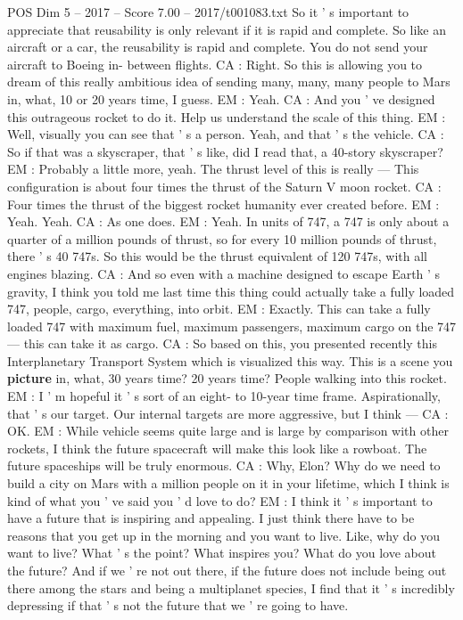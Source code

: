 \begin{textsample}{POS Dim 5 – 2017 – Score 7.00 – 2017/t001083.txt}
So it ' s important to appreciate that reusability is only relevant if it is rapid and complete.
So like an aircraft or a car, the reusability is rapid and complete.
You do not send your aircraft to Boeing in- between flights.
CA : Right.
So this is allowing you to dream of this really ambitious idea of sending many, many, many people to Mars in, what, 10 or 20 years time, I guess.
EM : Yeah.
CA : And you ' ve designed this outrageous rocket to do it.
Help us understand the scale of this thing.
EM : Well, visually you can see that ' s a person.
Yeah, and that ' s the vehicle.
CA : So if that was a skyscraper, that ' s like, did I read that, a 40-story skyscraper?
EM : Probably a little more, yeah.
The thrust level of this is really — This configuration is about four times the thrust of the Saturn V moon rocket.
CA : Four times the thrust of the biggest rocket humanity ever created before.
EM : Yeah.
Yeah.
CA : As one does.
EM : Yeah.
In units of 747, a 747 is only about a quarter of a million pounds of thrust, so for every 10 million pounds of thrust, there ' s 40 747s.
So this would be the thrust equivalent of 120 747s, with all engines blazing.
CA : And so even with a machine designed to escape Earth ' s gravity, I think you told me last time this thing could actually take a fully loaded 747, people, cargo, everything, into orbit.
EM : Exactly.
This can take a fully loaded 747 with maximum fuel, maximum passengers, maximum cargo on the 747 — this can take it as cargo.
CA : So based on this, you presented recently this Interplanetary Transport System which is visualized this way.
This is a scene you \textbf{picture} in, what, 30 years time? 20 years time?
People walking into this rocket.
EM : I ' m hopeful it ' s sort of an eight- to 10-year time frame.
Aspirationally, that ' s our target.
Our internal targets are more aggressive, but I think — CA : OK.
EM : While vehicle seems quite large and is large by comparison with other rockets, I think the future spacecraft will make this look like a rowboat.
The future spaceships will be truly enormous.
CA : Why, Elon?
Why do we need to build a city on Mars with a million people on it in your lifetime, which I think is kind of what you ' ve said you ' d love to do?
EM : I think it ' s important to have a future that is inspiring and appealing.
I just think there have to be reasons that you get up in the morning and you want to live.
Like, why do you want to live?
What ' s the point?
What inspires you?
What do you love about the future?
And if we ' re not out there, if the future does not include being out there among the stars and being a multiplanet species, I find that it ' s incredibly depressing if that ' s not the future that we ' re going to have.

\end{textsample}
